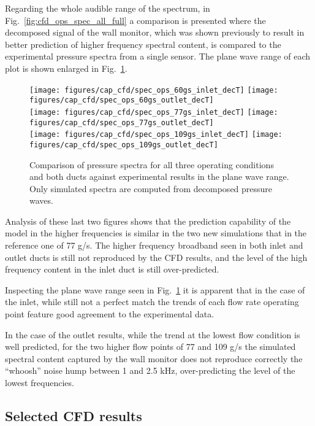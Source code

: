 Regarding the whole audible range of the spectrum, in Fig.~\ref{fig:cfd_ops_spec_all_full} a comparison is presented where the decomposed signal of the wall monitor, which was shown previously to result in better prediction of higher frequency spectral content, is compared to the experimental pressure spectra from a single sensor. The plane wave range of each plot is shown enlarged in Fig.~\ref{fig:cfd_ops_spec_all_decT}.

\begin{figure}[htb!]
\centering
\texttt{[image: figures/cap\_cfd/spec\_ops\_60gs\_inlet\_decT]}
\texttt{[image: figures/cap\_cfd/spec\_ops\_60gs\_outlet\_decT]}\\[4mm]
\texttt{[image: figures/cap\_cfd/spec\_ops\_77gs\_inlet\_decT]}
\texttt{[image: figures/cap\_cfd/spec\_ops\_77gs\_outlet\_decT]}\\[4mm]
\texttt{[image: figures/cap\_cfd/spec\_ops\_109gs\_inlet\_decT]}
\texttt{[image: figures/cap\_cfd/spec\_ops\_109gs\_outlet\_decT]}
\caption{Comparison of pressure spectra for all three operating conditions and both ducts against experimental results in the plane wave range. Only simulated spectra are computed from decomposed pressure waves.}
\label{fig:cfd_ops_spec_all_decT}
\end{figure}

Analysis of these last two figures shows that the prediction capability of the model in the higher frequencies is similar in the two new simulations that in the reference one of 77 g/s. The higher frequency broadband seen in both inlet and outlet ducts is still not reproduced by the CFD results, and the level of the high frequency content in the inlet duct is still over-predicted.

Inspecting the plane wave range seen in Fig.~\ref{fig:cfd_ops_spec_all_decT} it is apparent that in the case of the inlet, while still not a perfect match the trends of each flow rate operating point feature good agreement to the experimental data. 

In the case of the outlet results, while the trend at the lowest flow condition is well predicted, for the two higher flow points of 77 and 109 g/s the simulated spectral content captured by the wall monitor does not reproduce correctly the ``whoosh'' noise hump between 1 and 2.5 kHz, over-predicting the level of the lowest frequencies.

\subsection{Selected CFD results}


